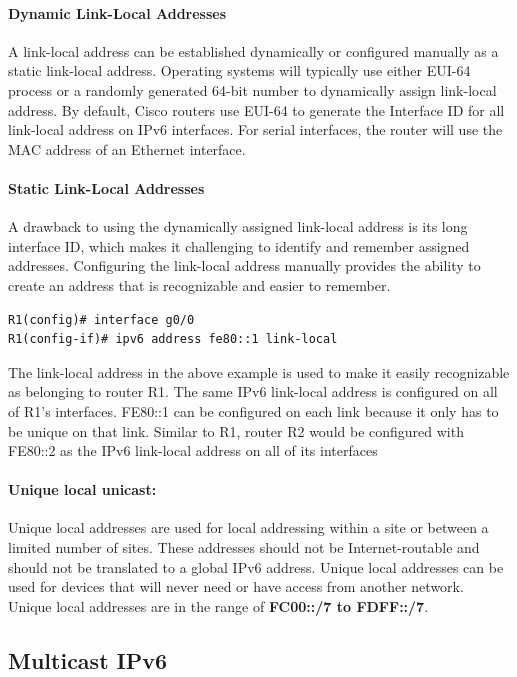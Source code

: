 \paragraph{Dynamic Link-Local Addresses} A link-local address can be established dynamically or configured manually as a static link-local address. Operating systems will typically use either EUI-64 process or a randomly generated 64-bit number to dynamically assign link-local address. By default, Cisco routers use EUI-64 to generate the Interface ID for all link-local address on IPv6 interfaces. For serial interfaces, the router will use the MAC address of an Ethernet interface.

\paragraph{Static Link-Local Addresses} A drawback to using the dynamically assigned link-local address is its long interface ID, which makes it challenging to identify and remember assigned addresses. Configuring the link-local address manually provides the ability to create an address that is recognizable and easier to remember.

\begin{verbatim}
R1(config)# interface g0/0
R1(config-if)# ipv6 address fe80::1 link-local
\end{verbatim}

The link-local address in the above example is used to make it easily recognizable as belonging to router R1. The same IPv6 link-local address is configured on all of R1's interfaces. FE80::1 can be configured on each link because it only has to be unique on that link. Similar to R1, router R2 would be configured with FE80::2 as the IPv6 link-local address on all of its interfaces

\paragraph{Unique local unicast:}Unique local addresses are used for local addressing within a site or between a limited number of sites. These addresses should not be Internet-routable and should not be translated to a global IPv6 address. Unique local addresses can be used for devices that will never need or have access from another network. Unique local addresses are in the range of \textbf{FC00::/7 to FDFF::/7}.

\subsection{Multicast IPv6}

